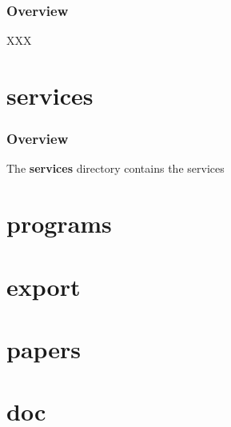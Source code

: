 \documentclass[8pt]{beamer}
\begin{document}

\begin{frame}
  \frametitle{Overview}

  XXX
\end{frame}

%
%

\section{services}


\begin{frame}
  \frametitle{Overview}

  The \textbf{services} directory contains the services
\end{frame}

%
%

\section{programs}

%
%

\section{export}

%
%

\section{papers}

%
%

\section{doc}
\end{document}
